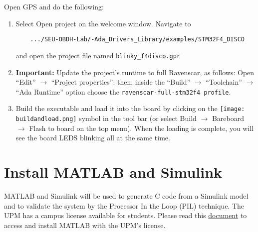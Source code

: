 Open GPS and do the following:
\begin{enumerate}
\item Select Open project on the welcome window. Navigate to

\begin{BVerbatim}
	.../SEU-OBDH-Lab/-Ada_Drivers_Library/examples/STM32F4_DISCO
\end{BVerbatim}

and open the project file named \texttt{blinky\_f4disco.gpr}

\item   \textbf{\textcolor{mRedBrown}{Important:}} Update the project's runtime to full Ravenscar, as follows: Open ``Edit'' $\rightarrow$ ``Project properties''; then, inside the ``Build'' $\rightarrow$ ``Toolchain'' $\rightarrow$ ``Ada Runtime'' option choose the \texttt{ravenscar-full-stm32f4 profile}.

\item	Build the executable and load it into the board by clicking on the \hbox{\texttt{[image: buildandload.png]}} symbol in the tool bar (or select Build $\rightarrow$ Bareboard $\rightarrow$ Flash to board on the top menu). When the loading is complete, you will see the board LEDS blinking all at the same time.
\end{enumerate}

\section{Install MATLAB\texttrademark{} and Simulink\texttrademark{}}

MATLAB and Simulink will be used to generate C code from a Simulink model and 
to validate the system by the Processor In the Loop (PIL) technique. The UPM has a campus license available for students.
Please read this \href{https://www.upm.es/sfs/Rectorado/Vicerrectorado\%20de\%20Tecnologias\%20de\%20la\%20Informacion\%20y\%20Servicios\%20en\%20Red/Servicio\%20de\%20Planificacion\%20Informatica\%20y\%20Comunicaciones/SW/MATLAB\_UPM\_Estudiantes.pdf}{document} to access and install MATLAB with the UPM's license.

